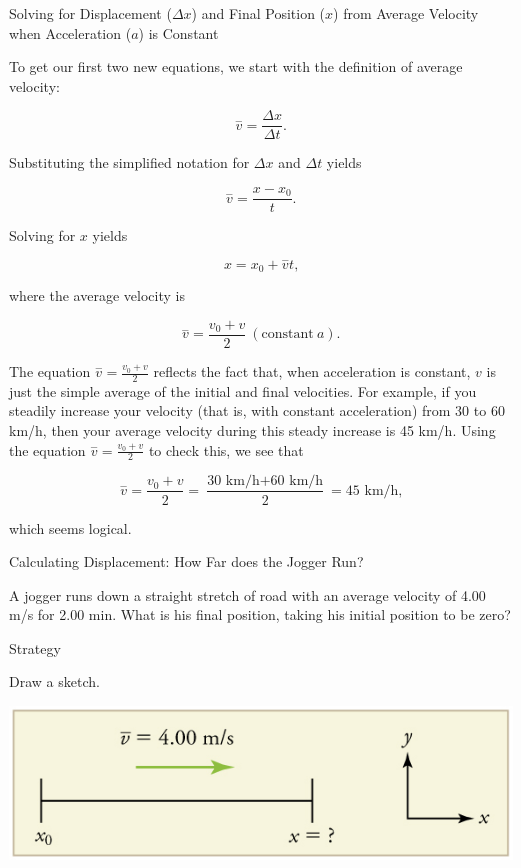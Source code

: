 \documentclass[
]{book}
\begin{document}
\hypertarget{fs-id1164906424651}{}
Solving for Displacement (\(\Delta x\)) and Final Position (\(x{}\)) from
Average Velocity when Acceleration (\(a{}\)) is Constant

To get our first two new equations, we start with the definition of
average velocity:

\leavevmode{}%
\[{{\overset{-}{v} = \frac{\Delta x}{\Delta t}}\text{.}}{}\]

Substituting the simplified notation for \(\Delta x\) and \(\Delta t\)
yields

\leavevmode{}%
\[{{\overset{-}{v} = \frac{x - x_{0}}{t}}\text{.}}{}\]

Solving for \(x{}\) yields

\leavevmode{}%
\[{{x = {x_{0} + \overset{-}{v}}}t\text{,}}{}\]

where the average velocity is

\leavevmode{}%
\[{{\overset{-}{v} = \frac{v_{0} + v}{2}}\ (\text{constant}\ a)\text{.}}{}\]

The equation \({\overset{-}{v} = \frac{v_{0} + v}{2}}{}\) reflects the
fact that, when acceleration is constant, \(v{}\) is just the simple
average of the initial and final velocities. For example, if you
steadily increase your velocity (that is, with constant acceleration)
from 30 to 60 km/h, then your average velocity during this steady
increase is 45 km/h. Using the equation
\({\overset{-}{v} = \frac{v_{0} + v}{2}}{}\) to check this, we see that

\leavevmode{}%
\[{{{\overset{-}{v} = \frac{v_{0} + v}{2}} = \frac{\text{30\ km/h} + \text{60\ km/h}}{2}} = \text{45\ km/h,}}{}\]

which seems logical.

\hypertarget{fs-id1164906442368}{}
Calculating Displacement: How Far does the Jogger Run?

A jogger runs down a straight stretch of road with an average velocity
of 4.00 m/s for 2.00 min. What is his final position, taking his initial
position to be zero?

{Strategy}

Draw a sketch.

\includegraphics{images/Figure_02_05_00a.jpg}
\end{document}
